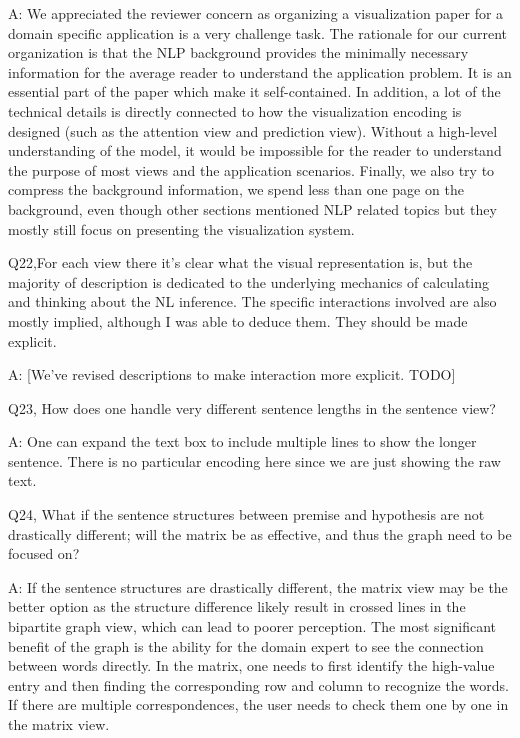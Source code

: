 A: We appreciated the reviewer concern as organizing a visualization paper for a domain specific application is a very challenge task. The rationale for our current organization is that the NLP background provides the minimally necessary information for the average reader to understand the application problem. It is an essential part of the paper which make it self-contained. In addition, a lot of the technical details is directly connected to how the visualization encoding is designed (such as the attention view and prediction view). Without a high-level understanding of the model, it would be impossible for the reader to understand the purpose of most views and the application scenarios. Finally, we also try to compress the background information, we spend less than one page on the background, even though other sections mentioned NLP related topics but they mostly still focus on presenting the visualization system.


Q22,For each view there it's clear what the visual representation is, but the majority of description is dedicated to the underlying mechanics of calculating and thinking about the NL inference. The specific interactions involved are also mostly implied, although I was able to deduce them. They should be made explicit.

A: [We've revised descriptions to make interaction more explicit. TODO]


Q23, How does one handle very different sentence lengths in the sentence view?

A: One can expand the text box to include multiple lines to show the longer sentence. There is no particular encoding here since we are just showing the raw text.


Q24, What if the sentence structures between premise and hypothesis are not drastically different; will the matrix be as effective, and thus the graph need to be focused on?

A: If the sentence structures are drastically different, the matrix view may be the better option as the structure difference likely result in crossed lines in the bipartite graph view, which can lead to poorer perception. The most significant benefit of the graph is the ability for the domain expert to see the connection between words directly. In the matrix, one needs to first identify the high-value entry and then finding the corresponding row and column to recognize the words. If there are multiple correspondences, the user needs to check them one by one in the matrix view.


